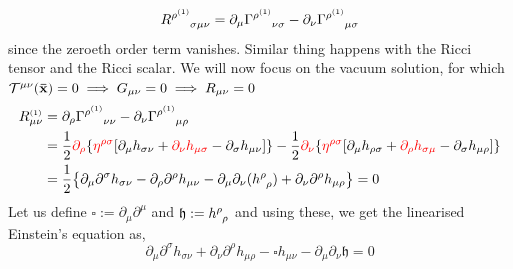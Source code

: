 $$\rie{{\rho^{\text{{\tiny(1)}}}}}{\sigma}{\mu}{\nu} = \partial_\mu {\chris{{\rho^\text{{\tiny (1)}}}}{\nu}{\sigma}}- \partial_\nu {\chris{{\rho^\text{{\tiny (1)}}}}{\mu}{\sigma}}$$
since the zeroeth order term vanishes. Similar thing happens with the Ricci tensor and the Ricci scalar. We will now focus on the vacuum solution, for which $\mathcal T^{\mu\nu}(\vb{\bar{x}}) = 0\implies G_{\mu\nu} = 0\implies R_{\mu\nu} = 0$
\begin{align*}
    R_{\mu\nu}^{\text{{\tiny (1)}}} &= \partial_\rho {\chris{{\rho^\text{{\tiny (1)}}}}{\nu}{\nu}}- \partial_\nu {\chris{{\rho^\text{{\tiny (1)}}}}{\mu}{\rho}}\\
    &=\frac{1}{2}\mathcolor{red}{\partial_\rho}\qty{\mathcolor{red}{\eta^{\rho\sigma}} \qty[\partial_\mu h_{\sigma\nu} +\mathcolor{red}{\partial_\nu h_{\mu\sigma}} - \partial_\sigma h_{\mu\nu} ]}-\frac{1}{2}\mathcolor{red}{\partial_\nu}\qty{\mathcolor{red}{\eta^{\rho\sigma}} \qty[\partial_\mu h_{\rho\sigma} +\mathcolor{red}{\partial_\rho h_{\sigma\mu}} - \partial_\sigma h_{\mu\rho} ]} \\
    &=\frac{1}{2}\qty{\partial_\mu \partial^\sigma h_{\sigma\nu} -\partial_\rho \partial^\rho h_{\mu\nu} - \partial_\mu \partial_\nu (\tensor{h}{^\rho _\rho}) +\partial_\nu \partial^{\rho}h_{\mu\rho}} = 0
\end{align*}
Let us define $\square :=\partial_\mu \partial^\mu$ and $\mathfrak{h}:=\tensor{h}{^\rho _\rho}$ and using these, we get the linearised Einstein's equation as,
\begin{equation}\label{eqn:lingrav}
   \boxed{ \partial_\mu \partial^\sigma h_{\sigma\nu}+\partial_\nu \partial^{\rho}h_{\mu\rho} -\square h_{\mu\nu} - \partial_\mu \partial_\nu \mathfrak{h} =0}
\end{equation}
